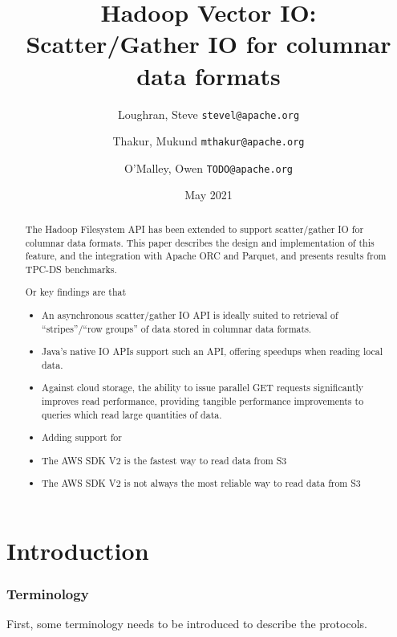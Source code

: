 \documentclass[conference]{IEEEtran}
\title{
    Hadoop Vector IO:\\
    Scatter/Gather IO for columnar data formats}
\author{
  Loughran, Steve
  \texttt{stevel@apache.org}\\
\and
  Thakur, Mukund
  \texttt{mthakur@apache.org}\\
\and
  O'Malley, Owen
  \texttt{TODO@apache.org}
}
\date{May 2021}
\begin{document}
\maketitle


\begin{abstract}
The Hadoop Filesystem API has been extended to support scatter/gather IO
for columnar data formats.
This paper describes the design and implementation of this feature,
and the integration with Apache ORC and Parquet, and
presents results from TPC-DS benchmarks.

Or key findings are that
\begin{itemize}
  \item An asynchronous scatter/gather IO API is ideally suited to retrieval
  of ``stripes''/``row groups'' of data stored in columnar data formats.
  \item Java's native IO APIs support such an API, offering speedups when reading
  local data.
  \item Against cloud storage, the ability to issue parallel GET requests
        significantly improves read performance, providing tangible performance
        improvements to queries which read large quantities of data.
  \item Adding support for
  \item The AWS SDK V2 is the fastest way to read data from S3
  \item The AWS SDK V2 is not always the most reliable way to read data from S3
\end{itemize}

\end{abstract}


\section{Introduction}
\label{sec:introduction}



\subsubsection{Terminology}

First, some terminology needs to be introduced to describe
the protocols.

\end{document}
